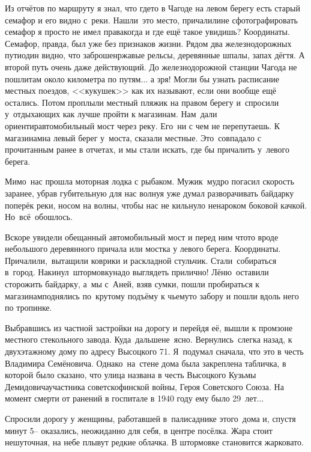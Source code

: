Из отчётов по маршруту я знал, что где\sdash то в Чагоде на левом берегу есть старый семафор и его видно с~реки. Нашли~это место, причалили\mdash не сфотографировать семафор я просто не имел права\mdash когда и где ещё такое увидишь? Координаты\mdash \CoordsChagodoschaSemaphor. Семафор, правда, был уже без признаков жизни. Рядом два железнодорожных пути\mdash один видно, что заброшен\mdash ржавые рельсы, деревянные шпалы, запах дёгтя. А второй путь очень даже действующий. До железнодорожной станции Чагода не пошли\mdash там около километра по путям$\ldots$ а зря! Могли бы узнать расписание местных поездов, <<кукушек>> как их называют, если они вообще ещё остались. 
\newpage
Потом проплыли местный пляжик на правом берегу и~спросили у~отдыхающих как лучше пройти к магазинам. Нам~дали ориентир\mdash автомобильный мост через реку. Его~ни с чем не перепутаешь. К магазинам\mdash на левый берег у~моста, сказали местные. Это~совпадало с прочитанным ранее в отчетах, и мы стали искать, где бы причалить у~левого берега. 

Мимо~нас прошла моторная лодка с рыбаком. Мужик~мудро погасил скорость заранее, убрав губительную для нас волну\mdash я уже думал разворачивать байдарку поперёк реки, носом на волны, чтобы нас не кильнуло ненароком боковой качкой. Но~всё~обошлось. 

Вскоре увидели обещанный автомобильный мост и перед ним что\sdash то вроде небольшого деревянного причала или мостка у левого берега. Координаты\mdash \CoordsChagodoschaFifteenGoToStore. Причалили,~вытащили коврики и раскладной стульчик. Стали~собираться в~город. Накинул~штормовку\mdash надо выглядеть прилично! Лёню~оставили сторожить байдарку, а~мы с~Аней, взяв сумки, пошли пробираться к магазинам\mdash поднялись по~крутому подъёму к чьему\sdash то забору и пошли вдоль него по тропинке. 

Выбравшись из частной застройки на дорогу и перейдя её, вышли к промзоне местного стекольного завода. Куда~дальше\mdash не~ясно. Вернулись~слегка назад, к двухэтажному дому по адресу Высоцкого 71. Я~подумал сначала, что это в честь Владимира Семёновича. Однако~на~стене дома была закреплена табличка, в которой было сказано, что улица названа в честь Высоцкого Кузьмы Демидовича\mdash участника советско\sdash финской войны, Героя Советского Союза. На момент смерти от ранений в госпитале в 1940 году ему было 29~лет$\ldots$ 

Спросили дорогу у женщины, работавшей в~палисаднике этого~дома и, спустя минут 5\thinspace-- оказались, неожиданно для себя, в центре посёлка. Жара стоит нешуточная, на небе плывут редкие облачка. В штормовке становится жарковато. 

